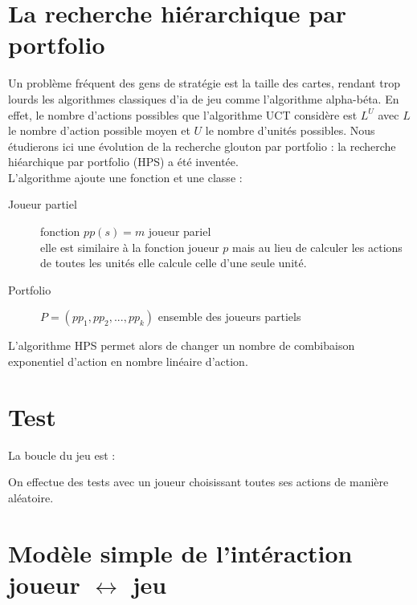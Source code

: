 \documentclass[a4paper, 11pt]{article}
\theoremstyle{definition}
\begin{document}
\section{La recherche hiérarchique par portfolio}
Un problème fréquent des gens de stratégie est la taille des cartes, rendant trop
lourds les algorithmes classiques d'ia de jeu comme l'algorithme alpha-béta. 
En effet, le nombre d'actions possibles que l'algorithme UCT considère est $L^U$
avec $L$ le nombre d'action possible moyen et $U$ le nombre d'unités possibles.
Nous étudierons ici une évolution de la recherche glouton par portfolio : la
recherche hiéarchique par portfolio (HPS) a été inventée.\\
L'algorithme ajoute une fonction et une classe :
\begin{description}
    \item[Joueur partiel] fonction $pp(s) = m$ joueur pariel \\
    elle est similaire à la fonction joueur $p$ mais au lieu de calculer les actions
    de toutes les unités elle calcule celle d'une seule unité.
    \item[Portfolio] $P = (pp_1, pp_2, ..., pp_k)$ ensemble des joueurs partiels
\end{description}
    L'algorithme HPS permet alors de changer un nombre de combibaison exponentiel
d'action en nombre linéaire d'action.

\section{Test}
La boucle du jeu est :
\begin{center}
\end{center}

On effectue des tests avec un joueur choisissant toutes ses actions de manière aléatoire.

\newpage

\section*{Modèle simple de l'intéraction joueur $\leftrightarrow$ jeu}
\end{document}
